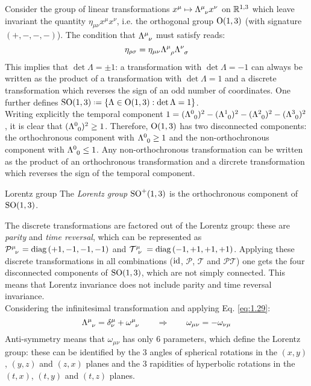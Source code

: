 Consider the group of linear transformations $ x^\mu \mapsto \tensor{\Lambda}{^\mu_\nu} x^\nu $ on $ \mathbb{R}^{1,3} $ which leave invariant the quantity $ \eta_{\mu \nu} x^\mu x^\nu $, i.e. the orthogonal group $ \mathrm{O}(1,3) $ (with signature $ (+,-,-,-) $). The condition that $ \tensor{\Lambda}{^\mu_\nu} $ must satisfy reads:
\begin{equation}
  \eta_{\rho \sigma} = \eta_{\mu \nu} \tensor{\Lambda}{^\mu_\rho} \tensor{\Lambda}{^\nu_\sigma}
  \label{eq:1.29}
\end{equation}
This implies that $ \det \Lambda = \pm 1 $: a transformation with $ \det \Lambda = -1 $ can always be written as the product of a transformation with $ \det \Lambda = 1 $ and a discrete transformation which reverses the sign of an odd number of coordinates. One further defines $ \SOn{1,3} \defeq \{\Lambda \in \On{1,3} : \det \Lambda = 1\} $.\\
Writing explicitly the temporal component $ 1 = (\tensor{\Lambda}{^0_0})^2 - (\tensor{\Lambda}{^1_0})^2 - (\tensor{\Lambda}{^2_0})^2 - (\tensor{\Lambda}{^3_0})^2 $, it is clear that $ (\tensor{\Lambda}{^0_0})^2 \ge 1 $. Therefore, $ \mathrm{O}(1,3) $ has two disconnected components: the orthochronous component with $ \tensor{\Lambda}{^0_0} \ge 1 $ and the non-orthochronous component with $ \tensor{\Lambda}{^0_0} \le 1 $. Any non-orthochronous transformation can be written as the product of an orthochronous transformation and a dircrete transformation which reverses the sign of the temporal component.

\begin{definition}{Lorentz group}{}
  The \textit{Lorentz group} $ \mathrm{SO}^+(1,3) $ is the orthochronous component of $ \mathrm{SO}(1,3) $.
\end{definition}

The discrete transformations are factored out of the Lorentz group: these are \textit{parity} and \textit{time reversal}, which can be represented as $ \tensor{\mathcal{P}}{^\mu_\nu} = \diag \left( +1,-1,-1,-1 \right) $ and $ \tensor{\mathcal{T}}{^\mu_\nu} = \diag \left( -1,+1,+1,+1 \right) $. Applying these discrete transformations in all combinations ($ \operatorname{id} $, $ \mathcal{P} $, $ \mathcal{T} $ and $ \mathcal{P} \mathcal{T} $) one gets the four disconnected components of $ \mathrm{SO}(1,3) $, which are not simply connected. This means that Lorentz invariance does not include parity and time reversal invariance.\\
Considering the infinitesimal transformation and applying Eq. \ref{eq:1.29}:
\begin{equation*}
  \tensor{\Lambda}{^\mu_\nu} = \delta^\mu_\nu + \tensor{\omega}{^\mu_\nu}
  \qquad \Rightarrow \qquad
  \omega_{\mu \nu} = - \omega_{\nu \mu}
\end{equation*}
Anti-symmetry means that $ \omega_{\mu \nu} $ has only 6 parameters, which define the Lorentz group: these can be identified by the 3 angles of spherical rotations in the $ (x,y) $, $ (y,z) $ and $ (z,x) $ planes and the 3 rapidities of hyperbolic rotations in the $ (t,x) $, $ (t,y) $ and $ (t,z) $ planes.

